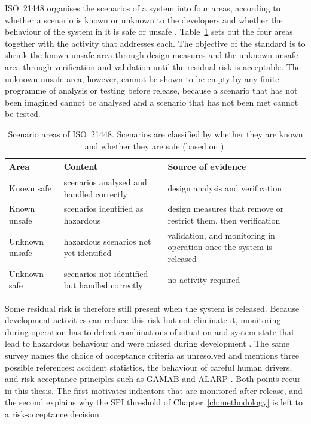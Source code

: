 ISO~21448 organises the scenarios of a system into four areas, according to whether a
scenario is known or unknown to the developers and whether the behaviour of the system
in it is safe or unsafe \cite{iso21448}. Table~\ref{tab:sotif_areas} sets out the four
areas together with the activity that addresses each. The objective of the standard is
to shrink the known unsafe area through design measures and the unknown unsafe area
through verification and validation until the residual risk is acceptable. The unknown
unsafe area, however, cannot be shown to be empty by any finite programme of analysis
or testing before release, because a scenario that has not been imagined cannot be
analysed and a scenario that has not been met cannot be tested.

\begin{table}[htbp]
    \centering
    \caption[Scenario areas of ISO~21448]{Scenario areas of ISO~21448. Scenarios are classified by whether they are known and whether they are safe (based on \cite{iso21448}).}
    \label{tab:sotif_areas}
    \small
    \begin{tabular}{@{}>{\raggedright\arraybackslash}p{2.9cm} >{\raggedright\arraybackslash}p{4.6cm} >{\raggedright\arraybackslash}p{6.3cm}@{}}
        \toprule
        \textbf{Area} & \textbf{Content} & \textbf{Source of evidence} \\
        \midrule
        Known safe & scenarios analysed and handled correctly & design analysis and
        verification \\[2pt]
        Known unsafe & scenarios identified as hazardous & design measures that remove
        or restrict them, then verification \\[2pt]
        Unknown unsafe & hazardous scenarios not yet identified & validation, and
        monitoring in operation once the system is released \\[2pt]
        Unknown safe & scenarios not identified but handled correctly & no activity
        required \\
        \bottomrule
    \end{tabular}
\end{table}

Some residual risk is therefore still present when the system is released. Because
development activities can reduce this risk but not eliminate it, monitoring during
operation has to detect combinations of situation and system state that lead to
hazardous behaviour and were missed during development \cite{wang2024sotif}. The same
survey names the choice of acceptance criteria as unresolved and mentions three
possible references: accident statistics, the behaviour of careful human drivers, and
risk-acceptance principles such as \ac{GAMAB} and \ac{ALARP} \cite{wang2024sotif}. Both points
recur in this thesis. The first motivates indicators that are monitored after release,
and the second explains why the SPI threshold of Chapter~\ref{ch:methodology} is left
to a risk-acceptance decision.

